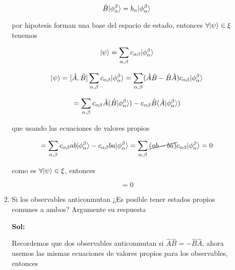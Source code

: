 \documentclass[12pt,a4paper]{article}
\DeclarePairedDelimiter\ket{\lvert}{\rangle}
\begin{document}
\begin{enumerate}
\begin{enumerate}
    \begin{equation*}
        \hat{B} \ket{\phi_{\alpha}^{\beta}} = b_{\alpha} \ket{\phi_{\alpha}^{\beta}} 
    \end{equation*}
    
    por hipotesis forman una base  del espacio de estado, entonces $\forall \ket{\psi} \in \xi$ tenemos
    
    \begin{equation*}
        \ket{\psi} = \sum_{\alpha, \beta} c_{\alpha \beta} \ket{\phi_{\alpha}^{\beta}}
    \end{equation*}
    
    \begin{equation*}
        [\hat{A},\hat{B}] \ket{\psi} = [\hat{A}, \hat{B}] \sum_{\alpha, \beta} c_{\alpha \beta} \ket{\phi_{\alpha}^{\beta}} = \sum_{\alpha, \beta}(\hat{A}\hat{B}- \hat{B}\hat{A}) c_{\alpha \beta} \ket{\phi_{\alpha}^{\beta}}
    \end{equation*}
    
    \begin{equation*}
        = \sum_{\alpha, \beta}c_{\alpha \beta} \hat{A}(\hat{B}  \ket{\phi_{\alpha}^{\beta}}) -c_{\alpha \beta}   \hat{B}(\hat{A}  \ket{\phi_{\alpha}^{\beta}})
    \end{equation*}
    
    que usando las ecuaciones de valores propios
    
    \begin{equation*}
        = \sum_{\alpha, \beta}c_{\alpha \beta} a b  \ket{\phi_{\alpha}^{\beta}} -c_{\alpha \beta}   b a  \ket{\phi_{\alpha}^{\beta}} = \sum_{\alpha, \beta}\cancel{(ab-ba)}c_{\alpha \beta} \ket{\phi_{\alpha}^{\beta}} = 0
    \end{equation*}
    
    como es $\forall \ket{\psi} \in \xi$, entonces
    
    \begin{equation*}
        [\hat{A}, \hat{B}] = 0
    \end{equation*}
    
    
    
    \item Si los observables anticonmutan ¿Es posible tener estados propios comunes a ambos? Argumente su respuesta
    
    \textbf{Sol:}
    
    Recordemos que dos observables anticonmutan si $\hat{A}\hat{B} = - \hat{B}\hat{A}$, ahora usemos las mismas ecuaciones de valores propios para los observables, entonces
    

\end{enumerate}
\end{enumerate}
\end{document}
